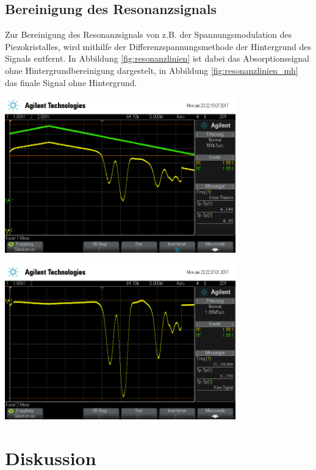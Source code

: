 \documentclass[captions=tableheading]{scrartcl}
\begin{document}
\subsection{Bereinigung des Resonanzsignals}
Zur Bereinigung des Resonanzsignals von z.B. der Spannungsmodulation des Piezokristalles, wird mithilfe der Differenzspannungsmethode der Hintergrund des Signals entfernt. In Abbildung \ref{fig:resonanzlinien} ist dabei das Absorptionssignal ohne Hintergrundbereinigung dargestelt, in Abbildung \ref{fig:resonanzlinien_mh} das finale Signal ohne Hintergrund.
\begin{center}
	\includegraphics[width=10cm]{images/resonanz.png}
	\label{fig:resonanzlinien}
\end{center}

\begin{center}
	\includegraphics[width=10cm]{images/resonanz_bereinigt.png}
	\label{fig:resonanzlinien_mh}
	\end{center}

\section{Diskussion}
\end{document}
